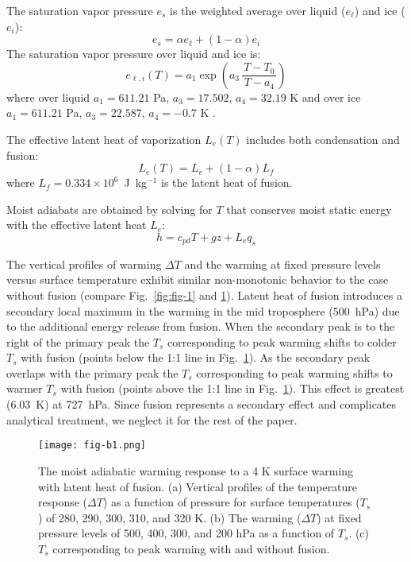 \documentclass[draft]{ametsocV6.1}
\begin{document}
The saturation vapor pressure $e_s$ is the weighted average over liquid ($e_\ell$) and ice ($e_i$):
\begin{equation}
e_s=\alpha e_{\ell}+(1-\alpha)e_i
\end{equation}
The saturation vapor pressure over liquid and ice is:
\begin{equation}
e_{\ell,i}(T) = a_1 \exp \left( a_3 \,\frac{T - T_0}{\,T - a_4\,} \right)
\label{eq:es_general}
\end{equation}
where over liquid $a_1=611.21$ Pa, $a_3=17.502$, $a_4=32.19$ K \citep{buck1981} and over ice $a_1=611.21$ Pa, $a_3=22.587$, $a_4=-0.7$ K \citep{alduchov1996}.

The effective latent heat of vaporization $L_e(T)$ includes both condensation and fusion:
\begin{equation}
L_e(T) = L_v + (1-\alpha) L_f
\end{equation}
where $L_f = 0.334 \times 10^6$~J~kg$^{-1}$ is the latent heat of fusion.

Moist adiabats are obtained by solving for $T$ that conserves moist static energy with the effective latent heat $L_e$:
\begin{equation}
    h = c_{pd}T + gz + L_e q_s
\end{equation}

The vertical profiles of warming $\Delta T$ and the warming at fixed pressure levels versus surface temperature exhibit similar non-monotonic behavior to the case without fusion (compare Fig.~\ref{fig:fig-1} and \ref{fig:fig-b1}). Latent heat of fusion introduces a secondary local maximum in the warming in the mid troposphere (500~hPa) due to the additional energy release from fusion. When the secondary peak is to the right of the primary peak the $T_s$ corresponding to peak warming shifts to colder $T_s$ with fusion (points below the 1:1 line in Fig.~\ref{fig:fig-b1}). As the secondary peak overlaps with the primary peak the $T_s$ corresponding to peak warming shifts to warmer $T_s$ with fusion (points above the 1:1 line in Fig.~\ref{fig:fig-b1}). This effect is greatest (6.03~K) at 727~hPa. Since fusion represents a secondary effect and complicates analytical treatment, we neglect it for the rest of the paper.

\begin{figure}[htbp]
 \centering
 \texttt{[image: fig-b1.png]}
 \caption{The moist adiabatic warming response to a 4 K surface warming with latent heat of fusion. (a) Vertical profiles of the temperature response ($\Delta T$) as a function of pressure for surface temperatures ($T_s$) of 280, 290, 300, 310, and 320 K. (b) The warming ($\Delta T$) at fixed pressure levels of 500, 400, 300, and 200 hPa as a function of $T_s$. (c) $T_s$ corresponding to peak warming with and without fusion.}\label{fig:fig-b1}
\end{figure}
\end{document}
